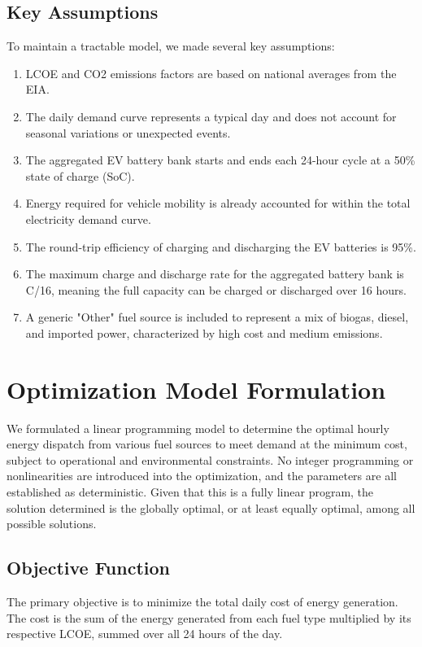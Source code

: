 \documentclass[12pt, letterpaper]{article}
\begin{document}
\subsection{Key Assumptions}
To maintain a tractable model, we made several key assumptions:
\begin{enumerate}
    \item LCOE and CO2 emissions factors are based on national averages from the EIA.
    \item The daily demand curve represents a typical day and does not account for seasonal variations or unexpected events.
    \item The aggregated EV battery bank starts and ends each 24-hour cycle at a 50\% state of charge (SoC).
    \item Energy required for vehicle mobility is already accounted for within the total electricity demand curve.
    \item The round-trip efficiency of charging and discharging the EV batteries is 95\%.
    \item The maximum charge and discharge rate for the aggregated battery bank is C/16, meaning the full capacity can be charged or discharged over 16 hours.
    \item A generic "Other" fuel source is included to represent a mix of biogas, diesel, and imported power, characterized by high cost and medium emissions.
\end{enumerate}

\section{Optimization Model Formulation}

We formulated a linear programming model to determine the optimal hourly energy dispatch from various fuel sources to meet demand at the minimum cost, subject to operational and environmental constraints. No integer programming or nonlinearities are introduced into the optimization, and the parameters are all established as deterministic. Given that this is a fully linear program, the solution determined is the globally optimal, or at least equally optimal, among all possible solutions.

\subsection{Objective Function}
The primary objective is to minimize the total daily cost of energy generation. The cost is the sum of the energy generated from each fuel type multiplied by its respective LCOE, summed over all 24 hours of the day.
\end{document}
